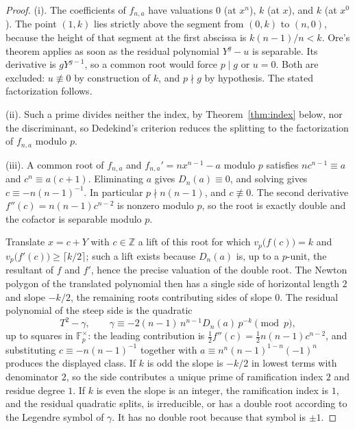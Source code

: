 \documentclass[11pt]{article}
\theoremstyle{definition}
\theoremstyle{remark}
\newcommand{\Z}{\mathbb{Z}}
\newcommand{\F}{\mathbb{F}}
\begin{document}
\begin{proof}
(i). The coefficients of $f_{n,a}$ have valuations $0$ (at $x^{n}$), $k$ (at $x$),
and $k$ (at $x^{0}$). The point $(1,k)$ lies strictly above the segment from
$(0,k)$ to $(n,0)$, because the height of that segment at the first abscissa is
$k(n-1)/n<k$. Ore's theorem applies as soon as the residual polynomial
$Y^{g}-u$ is separable. Its derivative is $gY^{g-1}$, so a common root would force
$p\mid g$ or $u=0$. Both are excluded: $u\not\equiv 0$ by construction of $k$, and
$p\nmid g$ by hypothesis. The stated factorization follows.

(ii). Such a prime divides neither the index, by Theorem~\ref{thm:index} below,
nor the discriminant, so Dedekind's criterion reduces the splitting to the
factorization of $f_{n,a}$ modulo $p$.

(iii). A common root of $f_{n,a}$ and $f_{n,a}'=nx^{n-1}-a$ modulo $p$ satisfies
$nc^{n-1}\equiv a$ and $c^{n}\equiv a(c+1)$. Eliminating $a$ gives
$D_n(a)\equiv 0$, and solving gives $c\equiv -n(n-1)^{-1}$. In particular
$p\nmid n(n-1)$, and $c\not\equiv 0$. The second derivative
$f''(c)=n(n-1)c^{n-2}$ is nonzero modulo $p$, so the root is exactly double and
the cofactor is separable modulo $p$.

Translate $x=c+Y$ with $c\in\Z$ a lift of this root for which
$v_p\bigl(f(c)\bigr)=k$ and $v_p\bigl(f'(c)\bigr)\ge\lceil k/2\rceil$; such a lift
exists because $D_n(a)$ is, up to a $p$-unit, the resultant of $f$ and $f'$, hence
the precise valuation of the double root. The Newton polygon of the translated
polynomial then has a single side of horizontal length $2$ and slope $-k/2$, the
remaining roots contributing sides of slope $0$. The residual polynomial of the
steep side is the quadratic
\[
T^{2}-\gamma,\qquad
\gamma\equiv -2(n-1)\,n^{n-1}D_n(a)\,p^{-k}\pmod{p},
\]
up to squares in $\F_p^{\times}$: the leading contribution is
$\tfrac12 f''(c)= \tfrac12 n(n-1)c^{n-2}$, and substituting
$c\equiv -n(n-1)^{-1}$ together with $a\equiv n^{n}(n-1)^{1-n}(-1)^{n}$ produces
the displayed class. If $k$ is odd the slope is $-k/2$ in lowest terms with
denominator $2$, so the side contributes a unique prime of ramification index $2$
and residue degree $1$. If $k$ is even the slope is an integer, the ramification
index is $1$, and the residual quadratic splits, is irreducible, or has a double
root according to the Legendre symbol of $\gamma$. It has no double root because
that symbol is $\pm 1$.
\end{proof}
\end{document}
